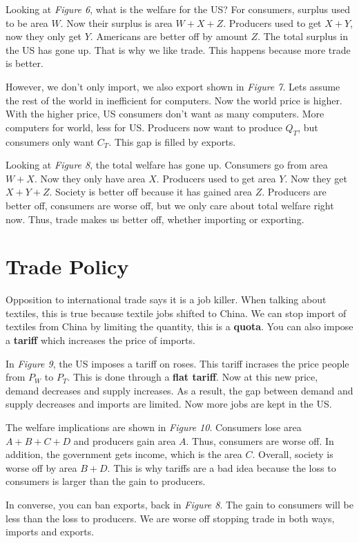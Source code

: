 \documentclass{article}
\begin{document}
Looking at \textit{Figure 6}, what is the welfare for the US? For consumers,
surplus used to be area $W$. Now their surplus is area $W+X+Z$. Producers used
to get $X+Y$, now they only get $Y$. Americans are better off by amount $Z$. The
total surplus in the US has gone up. That is why we like trade. This happens
because more trade is better. 

However, we don't only import, we also export shown in \textit{Figure 7}. Lets
assume the rest of the world in inefficient for computers. Now the world price
is higher. With the higher price, US consumers don't want as many computers.
More computers for world, less for US. Producers now want to produce $Q_T$, but
consumers only want $C_T$. This gap is filled by exports.

Looking at \textit{Figure 8}, the total welfare has gone up. Consumers go from
area $W+X$. Now they only have area $X$. Producers used to get area $Y$. Now
they get $X+Y+Z$. Society is better off because it has gained area $Z$.
Producers are better off, consumers are worse off, but we only care about total
welfare right now. Thus, trade makes us better off, whether importing or
exporting.

\section{Trade Policy}

Opposition to international trade says it is a job killer. When talking about
textiles, this is true because textile jobs shifted to China. We can stop import
of textiles from China by limiting the quantity, this is a \textbf{quota}. You
can also impose a \textbf{tariff} which increases the price of imports.

In \textit{Figure 9}, the US imposes a tariff on roses. This tariff incrases the
price people from $P_W$ to $P_T$. This is done through a \textbf{flat tariff}.
Now at this new price, demand decreases and supply increases. As a result, the
gap between demand and supply decreases and imports are limited. Now more jobs
are kept in the US. 

The welfare implications are shown in \textit{Figure 10}. Consumers lose area
$A+B+C+D$ and producers gain area $A$. Thus, consumers are worse off. In addition,
the government gets income, which is the area $C$. Overall, society is worse off
by area $B+D$. This is why tariffs are a bad idea because the loss to consumers
is larger than the gain to producers.

In converse, you can ban exports, back in \textit{Figure 8}. The gain to
consumers will be less than the loss to producers. We are worse off stopping
trade in both ways, imports and exports.
\end{document}
